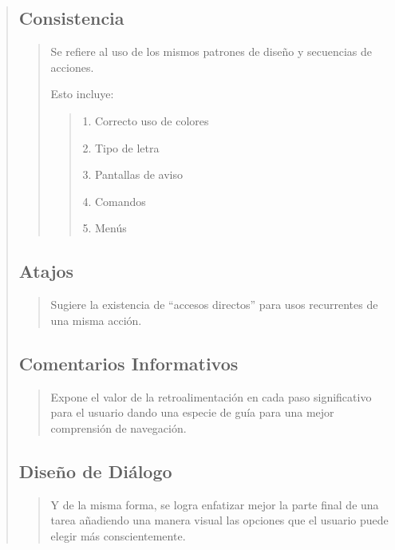 \documentclass[14pt]{article}
\begin{document}
        \begin{quote}
            \subsection*{Consistencia}
                \begin{quote}
                    Se refiere al uso de los mismos patrones de diseño y secuencias de acciones.

                    \vspace{0.5cm}Esto incluye:
            
                    \begin{quote}
                        1. Correcto uso de colores
                        
                        2. Tipo de letra
                        
                        3. Pantallas de aviso
                    
                        4. Comandos
                    
                        5. Menús
                    \end{quote}
                \end{quote}
            \subsection*{Atajos}
                \begin{quote}
                    Sugiere la existencia de ``accesos directos'' para usos recurrentes de una misma acción.
                \end{quote}
            \subsection*{Comentarios Informativos}
                \begin{quote}
                    Expone el valor de la retroalimentación en cada paso significativo para el usuario dando una especie de guía para una mejor comprensión de navegación.
                \end{quote}
            \subsection*{Diseño de Diálogo}
                \begin{quote}
                    Y de la misma forma, se logra enfatizar mejor la parte final de una tarea añadiendo una manera visual las opciones que el usuario puede elegir más conscientemente.
                \end{quote}

\end{quote}
\end{document}
